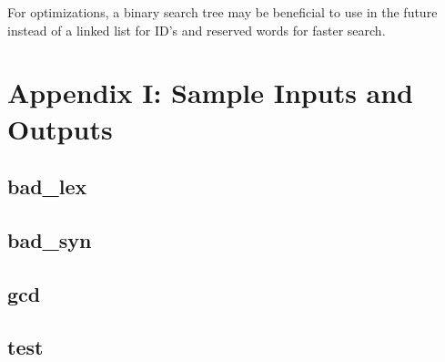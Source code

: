 \documentclass[titlepage]{article}
\begin{document}
For optimizations, a binary search tree may be beneficial to use in the future instead of a linked list for ID’s and reserved words for faster search.




\clearpage{}
\section*{Appendix I: Sample Inputs and Outputs}
\lstset{language=Pascal}

\subsection*{bad\_lex}




\clearpage{}
\subsection*{bad\_syn}




\clearpage{}
\subsection*{gcd}




\clearpage{}
\subsection*{test}




\clearpage{}
\end{document}
